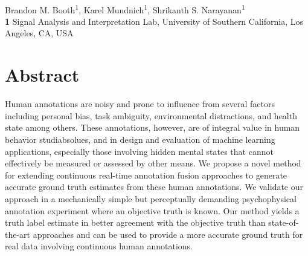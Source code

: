\documentclass[10pt,letterpaper]{article}
\date{}
\begin{document}
\vspace*{0.2in}

\begin{flushleft}
{\Large
\textbf{} %
}
\newline
\\
Brandon M. Booth\textsuperscript{1},
Karel Mundnich\textsuperscript{1},
Shrikanth S. Narayanan\textsuperscript{1}
\\
\bigskip
\textbf{1} Signal Analysis and Interpretation Lab, University of Southern California, Los Angeles, CA, USA
\\
\bigskip
\end{flushleft}


\section*{Abstract}
Human annotations are noisy and prone to influence from several factors including personal bias, task ambiguity, environmental distractions, and health state among others.  These annotations, however, are of integral value in human behavior studiabsolues, and in design and evaluation of machine learning applications, especially those involving hidden mental states that cannot effectively be measured or assessed by other means.  We propose a novel method for extending continuous real-time annotation fusion approaches to generate accurate ground truth estimates from these human annotations.  We validate our approach in a mechanically simple but perceptually demanding psychophysical annotation experiment where an objective truth is known.  Our method yields a truth label estimate in better agreement with the objective truth than state-of-the-art approaches and can be used to provide a more accurate ground truth for real data involving continuous human annotations.

\linenumbers
\end{document}
